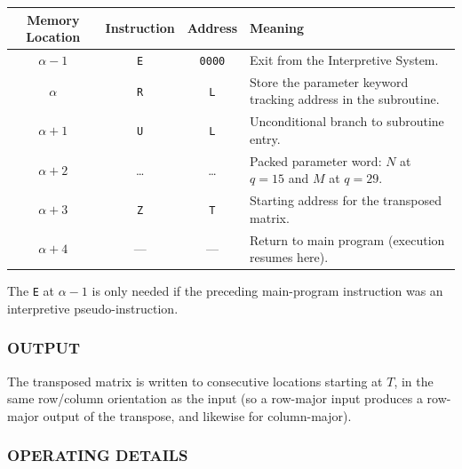 \medskip
\begin{table}[h!]
\centering
\begin{tabularx}{\textwidth}{cccX}
\toprule
\textbf{Memory Location} & \textbf{Instruction} & \textbf{Address} & \textbf{Meaning} \\
\midrule
$\alpha - 1$      & \texttt{E}      & \texttt{0000}    & Exit from the Interpretive System. \\
$\alpha$          & \texttt{R}      & \texttt{L}       & Store the parameter keyword tracking address in the subroutine. \\
$\alpha + 1$      & \texttt{U}      & \texttt{L}       & Unconditional branch to subroutine entry. \\
$\alpha + 2$      & \dots           & \dots            & Packed parameter word: $N$ at $q=15$ and $M$ at $q=29$. \\
$\alpha + 3$      & \texttt{Z}      & \texttt{T}       & Starting address for the transposed matrix. \\
$\alpha + 4$      & ---              & ---              & Return to main program (execution resumes here). \\
\bottomrule
\end{tabularx}
\end{table}

\medskip
\noindent
The \texttt{E} at $\alpha-1$ is only needed if the preceding main-program instruction was an interpretive pseudo-instruction.

\subsubsection*{OUTPUT}
The transposed matrix is written to consecutive locations starting at $T$, in the same row/column orientation as the input (so a row-major input produces a row-major output of the transpose, and likewise for column-major).

\subsubsection*{OPERATING DETAILS}

